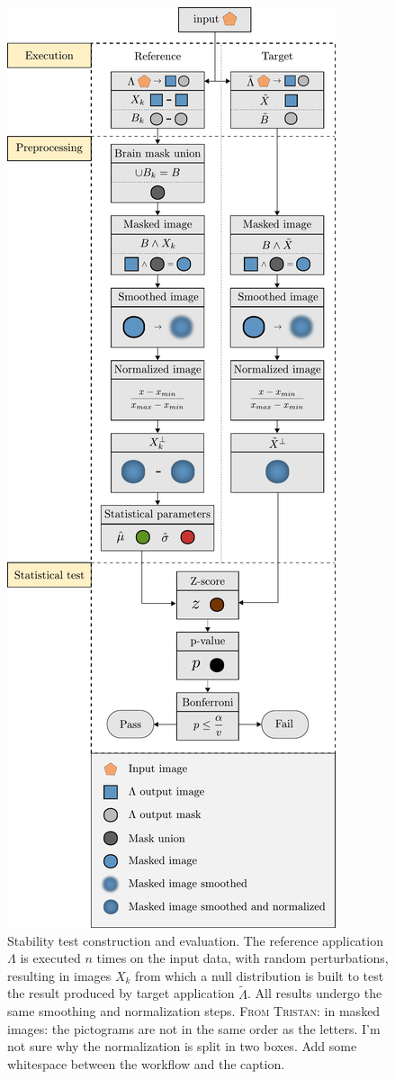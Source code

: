 \documentclass[lettersize,journal]{IEEEtran}
\newcommand{\TG}[1]{\color{blue}\textsc{From Tristan:} #1\color{black}\xspace}
\begin{document}
\begin{figure}
    \centering
    \includegraphics[width=\columnwidth]{figures/workflow_V.pdf}
    \caption{Stability test construction and evaluation. The reference application $\Lambda$ is executed $n$ times on the input data, with random perturbations, resulting in images $X_k$ from which a null distribution is built to test the result produced by target application $\tilde \Lambda$. All results undergo the same smoothing and normalization steps. \TG{in masked images: the pictograms are not in the same order as the letters. I'm not sure why the normalization is split in two boxes. Add some whitespace between the workflow and the caption.}}
    \label{fig:test_workflow}
\end{figure}
\end{document}
